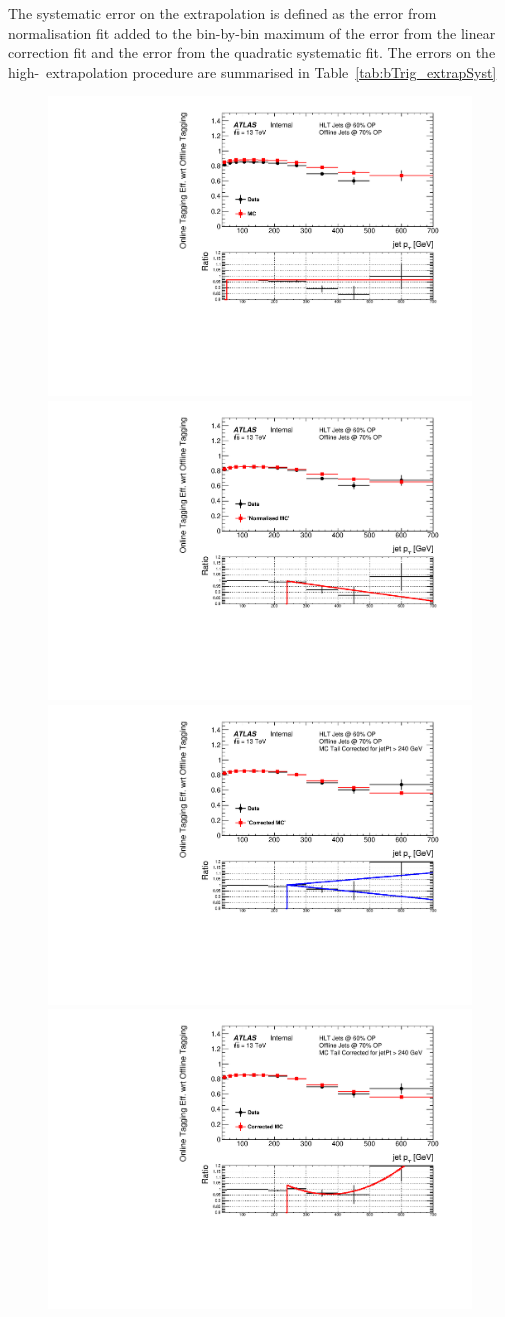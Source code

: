 The systematic error on the extrapolation is defined as the error from normalisation fit
added to the bin-by-bin maximum of the error from the linear correction fit and the error from the quadratic systematic fit.
The errors on the high-\pT~extrapolation procedure are summarised in Table~\ref{tab:bTrig_extrapSyst}
  
\begin{figure}[!ht]
\begin{center}
\captionsetup[subfigure]{aboveskip=0pt,justification=centering}
   {\includegraphics[width=0.47\linewidth, angle=0]{figs/Trigger/btrigger_old/Full_GRL_bslt2mm_trigReq_effFit_jetPt.pdf} }
   {\includegraphics[width=0.47\linewidth, angle=0]{figs/Trigger/btrigger_old/Full_GRL_bslt2mm_trigReq_effNormFit_jetPt.pdf}} \\
   {\includegraphics[width=0.47\linewidth, angle=0]{figs/Trigger/btrigger_old/Full_GRL_bslt2mm_trigReq_effCorrShapeErr_jetPt.pdf}}
   {\includegraphics[width=0.47\linewidth, angle=0]{figs/Trigger/btrigger_old/Full_GRL_bslt2mm_trigReq_effCorrFitQuad_jetPt.pdf}}

\end{center}
\end{figure}
